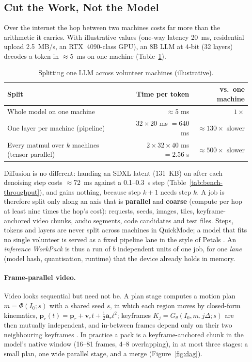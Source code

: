 \documentclass[11pt,a4paper]{article}
\theoremstyle{definition}
\theoremstyle{plain}
\begin{document}
\subsection{Cut the Work, Not the Model}

Over the internet the hop between two machines costs far more than the arithmetic it carries. With
illustrative values (one-way latency 20~ms, residential upload 2.5~MB/s, an RTX~4090-class GPU), an 8B LLM at
4-bit (32 layers) decodes a token in $\approx$5~ms on one machine (Table~\ref{tab:split}).

\begin{table}[ht]
\centering
\caption{Splitting one LLM across volunteer machines (illustrative).}\label{tab:split}
\small
\begin{tabular}{@{}lrr@{}}
\toprule
\textbf{Split} & \textbf{Time per token} & \textbf{vs.\ one machine} \\
\midrule
Whole model on one machine & $\approx$5 ms & $1\times$ \\
One layer per machine (pipeline) & $32\times 20$ ms $=640$ ms & $\approx130\times$ slower \\
Every matmul over $k$ machines (tensor parallel) & $2\times32\times40$ ms $=2.56$ s & $\approx500\times$ slower \\
\bottomrule
\end{tabular}
\end{table}

Diffusion is no different: handing an SDXL latent (131~KB) on after each denoising step costs
$\approx$72~ms against a 0.1--0.3~s step (Table~\ref{tab:bench-throughput}), and gains nothing, because step $k{+}1$ needs step $k$. A job is
therefore split only along an axis that is \textbf{parallel} and \textbf{coarse} (compute per hop at least
nine times the hop's cost): requests, seeds, images, tiles, keyframe-anchored video chunks, audio segments,
code candidates and test files. Steps, tokens and layers are never split across machines in QuickMode; a
model that fits no single volunteer is served as a fixed pipeline lane in the style of Petals
\citep{borzunov2023petals}. An \emph{inference WorkPack} is thus a run of $b$ independent units of one job, for
one \emph{lane} (model hash, quantisation, runtime) that the device already holds in memory.

\paragraph{Frame-parallel video.} Video looks sequential but need not be. A plan stage computes a motion plan
$m=\Phi(I_0;s)$ with a shared seed $s$, in which each region moves by closed-form kinematics,
$\mathbf{p}_r(t)=\mathbf{p}_r+\mathbf{v}_rt+\tfrac12\mathbf{a}_rt^2$; keyframes $K_j=G_\theta(I_0,m,j\Delta;s)$ are
then mutually independent, and in-between frames depend only on their two neighbouring keyframes
\citep{huang2022rife}. In practice a pack is a keyframe-anchored chunk in the model's native window (16--81 frames,
4--8 overlapping), in at most three stages: a small plan, one wide parallel stage, and a merge
(Figure~\ref{fig:dag}).
\end{document}
